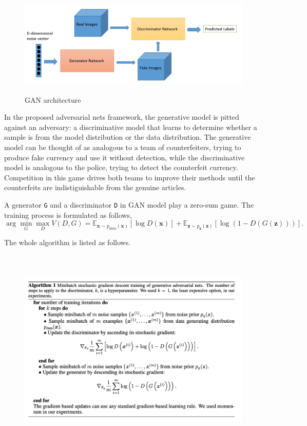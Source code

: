 \documentclass[a4paper]{article}
\begin{document}
\vspace{3mm}
\begin{figure}[h]
\centering
\includegraphics[width=12.5cm,height=5cm]{GAN.png}
\caption{\textsf{GAN} architecture}
\end{figure}
\vspace{3mm}

In the proposed adversarial nets framework, the generative model is pitted against an adversary: a discriminative model that learns to determine whether a sample is from the model distribution or the data distribution. The generative model can be thought of as analogous to a team of counterfeiters, trying to produce fake currency and use it without detection, while the discriminative model is analogous to the police, trying to detect the counterfeit currency. Competition in this game drives both teams to improve their methods until the counterfeits are indistiguishable from the genuine articles. 

A generator \texttt{G} and a discriminator \texttt{D} in \textsf{GAN} model play a zero-sum game. The training process is formulated as follows,
\begin{equation}
\arg \mathop{\min}_{G}\mathop{\max}_{D}V(D,G)=\mathbb{E}_{ \boldsymbol x\sim p_{data}(\boldsymbol x)} [\log D(\boldsymbol x)] + \mathbb{E}_{ \boldsymbol z\sim p_{ \boldsymbol z}(\boldsymbol z)} [\log {(1-D(G(\boldsymbol z)))}].
\end{equation}

The whole algorithm is listed as follows.

\begin{figure}[h]
\centering
\includegraphics[width=14.8cm,height=9.75cm]{GANalg.png}
\end{figure}
\end{document}
